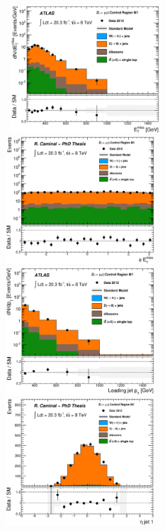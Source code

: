 \begin{figure}[!ht]
  \begin{center}
    \mbox{
      \includegraphics[width=0.495\textwidth]{MonojetAnalysis/Figures/plot_Stop_A6_CRzmm_met_fitted.eps}
      \includegraphics[width=0.495\textwidth]{MonojetAnalysis/Figures/plot_Stop_A6_CRzmm_met_phi_fitted.eps}
    }
    \mbox{
      \includegraphics[width=0.495\textwidth]{MonojetAnalysis/Figures/plot_Stop_A6_CRzmm_pt1_fitted.eps}
      \includegraphics[width=0.495\textwidth]{MonojetAnalysis/Figures/plot_Stop_A6_CRzmm_eta1_fitted.eps}
}
\end{center}
\end{figure}
